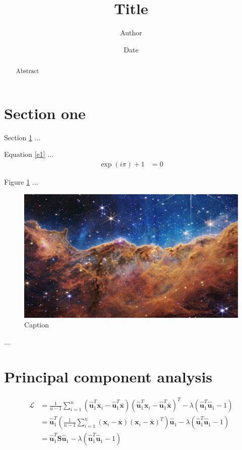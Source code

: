 \documentclass{article}
\title{Title}
\author{Author}
\date{Date}
\begin{document}
\maketitle

\begin{abstract}
	Abstract
\end{abstract}

\section{Section one}
\label{s1}
Section \ref{s1} $\ldots$

Equation \eqref{e1} $\ldots$
\begin{align}
	\exp\left(i\pi\right)+1 & =0
	\label{e1}
\end{align}

Figure \ref{f1} $\ldots$
\begin{figure}
	\centering
	\includegraphics[width=0.7\linewidth]{2022090124bd9f962f9b894dc131a333eaa4c91c31ab71499b40f9d8f48ff56abcf96458/nasas-webb-reveals-cosmic-cliffs-glittering-landscape-of-star-birth_52211883534_o}
	\caption{Caption}
	\label{f1}
\end{figure}

\citet{Thomas2018} $\ldots$

\section{Principal component analysis}

\begin{align}
	\mathcal{L} & =\frac{1}{n-1}\sum_{i=1}^{n}\left(\hat{\mathbf{u}}_{1}^{T}\mathbf{x}_{i}-\hat{\mathbf{u}}_{1}^{T}\bar{\mathbf{x}}\right)\left(\hat{\mathbf{u}}_{1}^{T}\mathbf{x}_{i}-\hat{\mathbf{u}}_{1}^{T}\bar{\mathbf{x}}\right)^{T}-\lambda\left(\hat{\mathbf{u}}_{1}^{T}\hat{\mathbf{u}}_{1}-1\right)\\
	& =\hat{\mathbf{u}}_{1}^{T}\left(\frac{1}{n-1}\sum_{i=1}^{n}\left(\mathbf{x}_{i}-\bar{\mathbf{x}}\right)\left(\mathbf{x}_{i}-\bar{\mathbf{x}}\right)^{T}\right)\hat{\mathbf{u}}_{1}-\lambda\left(\hat{\mathbf{u}}_{1}^{T}\hat{\mathbf{u}}_{1}-1\right)\\
	& =\hat{\mathbf{u}}_{1}^{T}\mathbf{S}\hat{\mathbf{u}}_{1}-\lambda\left(\hat{\mathbf{u}}_{1}^{T}\hat{\mathbf{u}}_{1}-1\right)
\end{align}
\end{document}
